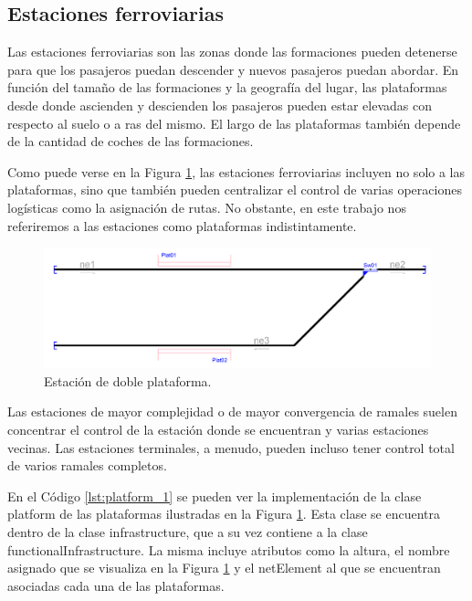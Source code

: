 \subsection{Estaciones ferroviarias}
    \label{sec:platform}
    
    Las estaciones ferroviarias son las zonas donde las formaciones pueden detenerse para que los pasajeros puedan descender y nuevos pasajeros puedan abordar. En función del tamaño de las formaciones y la geografía del lugar, las plataformas desde donde ascienden y descienden los pasajeros pueden estar elevadas con respecto al suelo o a ras del mismo. El largo de las plataformas también depende de la cantidad de coches de las formaciones.
    
    Como puede verse en la Figura \ref{fig:estacion_1}, las estaciones ferroviarias incluyen no solo a las plataformas, sino que también pueden centralizar el control de varias operaciones logísticas como la asignación de rutas. No obstante, en este trabajo nos referiremos a las estaciones como plataformas indistintamente.
    
        \begin{figure}[H]
            \centering
            \includegraphics[width=1\textwidth]{Figuras/Platform.png}
            \centering\caption{Estación de doble plataforma.}
            \label{fig:estacion_1}
        \end{figure}
    
    Las estaciones de mayor complejidad o de mayor convergencia de ramales suelen concentrar el control de la estación donde se encuentran y varias estaciones vecinas. Las estaciones terminales, a menudo, pueden incluso tener control total de varios ramales completos.

    En el Código \ref{lst:platform_1} se pueden ver la implementación de la clase platform de las plataformas ilustradas en la Figura \ref{fig:estacion_1}. Esta clase se encuentra dentro de la clase infrastructure, que a su vez contiene a la clase functionalInfrastructure. La misma incluye atributos como la altura, el nombre asignado que se visualiza en la Figura \ref{fig:estacion_1} y el netElement al que se encuentran asociadas cada una de las plataformas.

